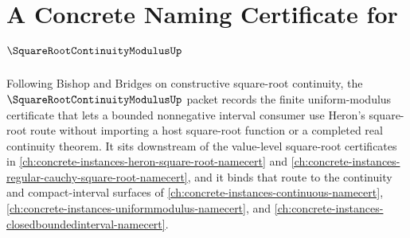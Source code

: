\chapter{A Concrete Naming Certificate for $\SquareRootContinuityModulusUp$}
\label{ch:concrete-instances-square-root-continuity-modulus-namecert}

Following Bishop and Bridges on constructive square-root continuity, the $\SquareRootContinuityModulusUp$ packet records the finite uniform-modulus certificate that lets a bounded nonnegative interval consumer use Heron's square-root route without importing a host square-root function or a completed real continuity theorem. It sits downstream of the value-level square-root certificates in \autoref{ch:concrete-instances-heron-square-root-namecert} and \autoref{ch:concrete-instances-regular-cauchy-square-root-namecert}, and it binds that route to the continuity and compact-interval surfaces of \autoref{ch:concrete-instances-continuous-namecert}, \autoref{ch:concrete-instances-uniformmodulus-namecert}, and \autoref{ch:concrete-instances-closedboundedinterval-namecert}.

